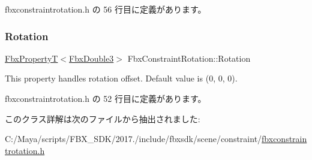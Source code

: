 fbxconstraintrotation.\+h の 56 行目に定義があります。

\mbox{\label{class_fbx_constraint_rotation_aa0bb0aa79b3f983ede4a376f12adb1c9}} 
\subsubsection{\texorpdfstring{Rotation}{Rotation}}
{\footnotesize\ttfamily \hyperlink{class_fbx_property_t}{Fbx\+PropertyT}$<$\hyperlink{fbxtypes_8h_ae0a96f14cde566774c7553aa7523b7a7}{Fbx\+Double3}$>$ Fbx\+Constraint\+Rotation\+::\+Rotation}

This property handles rotation offset. Default value is (0, 0, 0). 

 fbxconstraintrotation.\+h の 52 行目に定義があります。



このクラス詳解は次のファイルから抽出されました\+:\begin{DoxyCompactItemize}
\item 
C\+:/\+Maya/scripts/\+F\+B\+X\+\_\+\+S\+D\+K/2017./include/fbxsdk/scene/constraint/\hyperlink{fbxconstraintrotation_8h}{fbxconstraintrotation.\+h}\end{DoxyCompactItemize}
